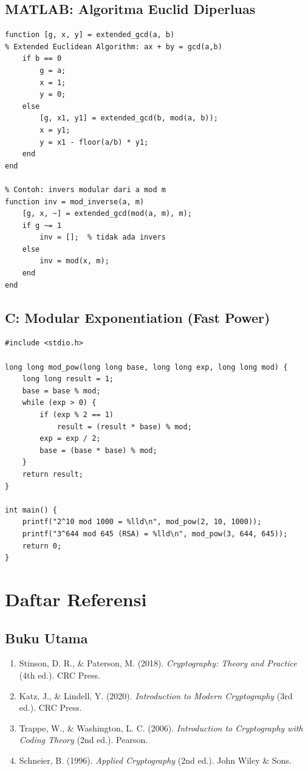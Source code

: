 \documentclass[12pt,a4paper]{article}
\begin{document}
\subsection{MATLAB: Algoritma Euclid Diperluas}
\begin{lstlisting}[style=matlab,caption={Extended Euclidean Algorithm dalam MATLAB}]
function [g, x, y] = extended_gcd(a, b)
% Extended Euclidean Algorithm: ax + by = gcd(a,b)
    if b == 0
        g = a;
        x = 1;
        y = 0;
    else
        [g, x1, y1] = extended_gcd(b, mod(a, b));
        x = y1;
        y = x1 - floor(a/b) * y1;
    end
end

% Contoh: invers modular dari a mod m
function inv = mod_inverse(a, m)
    [g, x, ~] = extended_gcd(mod(a, m), m);
    if g ~= 1
        inv = [];  % tidak ada invers
    else
        inv = mod(x, m);
    end
end
\end{lstlisting}

\subsection{C: Modular Exponentiation (Fast Power)}
\begin{lstlisting}[style=cstyle,caption={Fast Modular Exponentiation dalam C}]
#include <stdio.h>

long long mod_pow(long long base, long long exp, long long mod) {
    long long result = 1;
    base = base % mod;
    while (exp > 0) {
        if (exp % 2 == 1)
            result = (result * base) % mod;
        exp = exp / 2;
        base = (base * base) % mod;
    }
    return result;
}

int main() {
    printf("2^10 mod 1000 = %lld\n", mod_pow(2, 10, 1000));
    printf("3^644 mod 645 (RSA) = %lld\n", mod_pow(3, 644, 645));
    return 0;
}
\end{lstlisting}

\section{Daftar Referensi}

\subsection{Buku Utama}
\begin{enumerate}
\item Stinson, D. R., \& Paterson, M. (2018). \textit{Cryptography: Theory and Practice} (4th ed.). CRC Press.
\item Katz, J., \& Lindell, Y. (2020). \textit{Introduction to Modern Cryptography} (3rd ed.). CRC Press.
\item Trappe, W., \& Washington, L. C. (2006). \textit{Introduction to Cryptography with Coding Theory} (2nd ed.). Pearson.
\item Schneier, B. (1996). \textit{Applied Cryptography} (2nd ed.). John Wiley \& Sons.
\end{enumerate}
\end{document}
